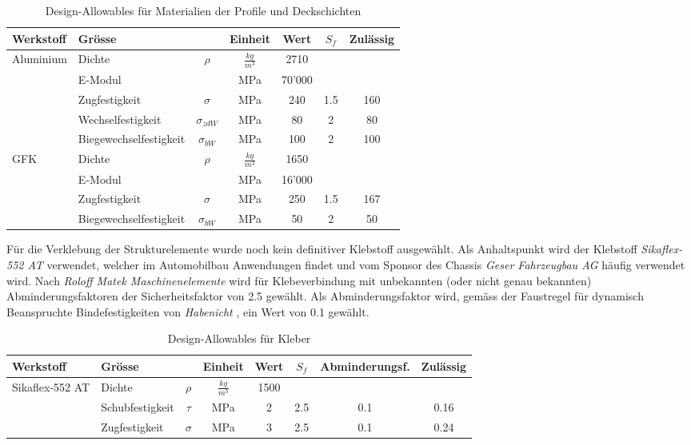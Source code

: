 \begin{table}[H]
  \centering
  \caption{Design-Allowables für Materialien der Profile und Deckschichten}
  \begin{tabular}{llccccc}	\hline
    Werkstoff	&	Grösse	&		&	Einheit	&	Wert	&	$S_f$	&	Zulässig\\	\hline
    \multirow{5}{*}{Aluminium\cite{alu1}}	&	Dichte	&	$\rho$        	&	$\frac{kg}{m^3}$	&	2710	&		&		\\
      &	E-Modul	&	              	&	MPa	&	70'000	&		&		\\
      &	Zugfestigkeit	&	$\sigma$      	&	MPa	&	240	&	1.5	&	160	\\
      &	Wechselfestigkeit	&	$\sigma_{zdW}$	&	MPa	&	80	&	2	&	80	\\
      &	Biegewechselfestigkeit	&	$\sigma_{bW}$ 	&	MPa	&	100	&	2	&	100	\\	\hline
    \multirow{4}{*}{GFK\cite{Roloff}}	&	Dichte	&	$\rho$        	&	$\frac{kg}{m^3}$	&	1650	&		&		\\
      &	E-Modul	&	              	&	MPa	&	16'000	&		&		\\
      &	Zugfestigkeit	&	$\sigma$      	&	MPa	&	250	&	1.5	&	167	\\
      &	Biegewechselfestigkeit	&	$\sigma_{bW}$ 	&	MPa	&	50	&	2	&	50	\\	\hline
  \end{tabular}
  \label{tab:Design-Allowables}
\end{table}

Für die Verklebung der Strukturelemente wurde noch kein definitiver Klebstoff ausgewählt. Als Anhaltspunkt wird der Klebstoff \emph{Sikaflex-552 AT} verwendet, welcher im Automobilbau Anwendungen findet und vom Sponsor des Chassis \emph{Geser Fahrzeugbau AG} häufig verwendet wird. Nach \emph{Roloff Matek Maschinenelemente} wird für Klebeverbindung mit unbekannten (oder nicht genau bekannten) Abminderungsfaktoren der Sicherheitsfaktor von 2.5 gewählt. Als Abminderungsfaktor wird, gemäss der Faustregel für dynamisch Beanspruchte Bindefestigkeiten von \emph{Habenicht} \cite{kleben1}, ein Wert von 0.1 gewählt.

\begin{table}[H]
  \centering
  \caption{Design-Allowables für Kleber}
  \begin{tabular}{llcccccc}	\hline
    Werkstoff	&	Grösse	&		&	Einheit	&	Wert	&	$S_f$	&	Abminderungsf.&	Zulässig	\\	\hline
    \multirow{3}{*}{Sikaflex-552 AT}	&	Dichte	&	$\rho$        	&	$\frac{kg}{m^3}$	&	1500	&		&		&		\\
      &	Schubfestigkeit	&	$\tau$	&	MPa	&	2	&	2.5	&	0.1	&	0.16	\\
      &	Zugfestigkeit	&	$\sigma$      	&	MPa	&	3	&	2.5	&	0.1	&	0.24	\\	\hline
  \end{tabular}
  \label{tab:Design-Allowables Kleben}
\end{table}

